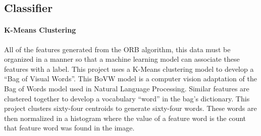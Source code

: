 \documentclass[stu,hidelinks,floatsintext,donotrepeattitle]{apa7}
\begin{document}
\subsection{Classifier}
\paragraph{K-Means Clustering}
All of the features generated from the ORB algorithm, this data must be organized in a manner so that a machine learning model can associate these features with a label. This project uses a K-Means clustering model to develop a ``Bag of Visual Words''. This BoVW model is a computer vision adaptation of the Bag of Words model used in Natural Language Processing. Similar features are clustered together to develop a vocabulary ``word'' in the bag's dictionary. This project clusters sixty-four centroids to generate sixty-four words. These words are then normalized in a histogram where the value of a feature word is the count that feature word was found in the image.
\end{document}
